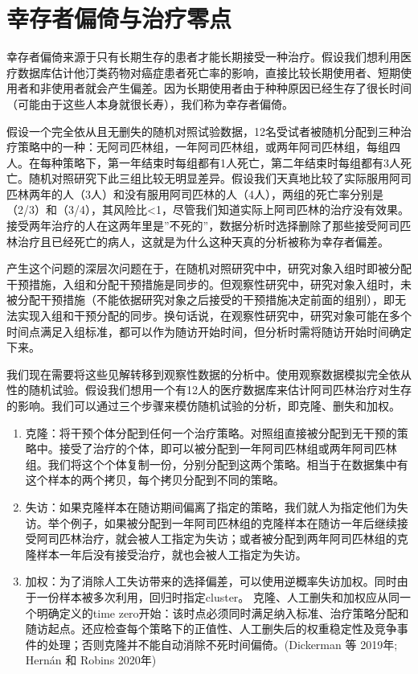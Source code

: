 \documentclass[
  chinese-hans,
  letterpaper,
  DIV=11,
  numbers=noendperiod]{scrreprt}
\begin{document}
\section{幸存者偏倚与治疗零点}\label{ux5e78ux5b58ux8005ux504fux501aux4e0eux6cbbux7597ux96f6ux70b9}

幸存者偏倚来源于只有长期生存的患者才能长期接受一种治疗。假设我们想利用医疗数据库估计他汀类药物对癌症患者死亡率的影响，直接比较长期使用者、短期使用者和非使用者就会产生偏差。因为长期使用者由于种种原因已经生存了很长时间（可能由于这些人本身就很长寿），我们称为幸存者偏倚。

假设一个完全依从且无删失的随机对照试验数据，12名受试者被随机分配到三种治疗策略中的一种：无阿司匹林组，一年阿司匹林组，或两年阿司匹林组，每组四人。在每种策略下，第一年结束时每组都有1人死亡，第二年结束时每组都有3人死亡。随机对照研究下此三组比较无明显差异。假设我们天真地比较了实际服用阿司匹林两年的人（3人）和没有服用阿司匹林的人（4人），两组的死亡率分别是（2/3）和（3/4），其风险比\textless1，尽管我们知道实际上阿司匹林的治疗没有效果。接受两年治疗的人在这两年里是''不死的''，数据分析时选择删除了那些接受阿司匹林治疗且已经死亡的病人，这就是为什么这种天真的分析被称为幸存者偏差。

产生这个问题的深层次问题在于，在随机对照研究中中，研究对象入组时即被分配干预措施，入组和分配干预措施是同步的。但观察性研究中，研究对象入组时，未被分配干预措施（不能依据研究对象之后接受的干预措施决定前面的组别），即无法实现入组和干预分配的同步。换句话说，在观察性研究中，研究对象可能在多个时间点满足入组标准，都可以作为随访开始时间，但分析时需将随访开始时间确定下来。

我们现在需要将这些见解转移到观察性数据的分析中。使用观察数据模拟完全依从性的随机试验。假设我们想用一个有12人的医疗数据库来估计阿司匹林治疗对生存的影响。我们可以通过三个步骤来模仿随机试验的分析，即克隆、删失和加权。

\begin{enumerate}
\def\labelenumi{\arabic{enumi}.}
\item
  克隆：将干预个体分配到任何一个治疗策略。对照组直接被分配到无干预的策略中。接受了治疗的个体，即可以被分配到一年阿司匹林组或两年阿司匹林组。我们将这个个体复制一份，分别分配到这两个策略。相当于在数据集中有这个样本的两个拷贝，每个拷贝分配到不同的策略。
\item
  失访：如果克隆样本在随访期间偏离了指定的策略，我们就人为指定他们为失访。举个例子，如果被分配到一年阿司匹林组的克隆样本在随访一年后继续接受阿司匹林治疗，就会被人工指定为失访；或者被分配到两年阿司匹林组的克隆样本一年后没有接受治疗，就也会被人工指定为失访。
\item
  加权：为了消除人工失访带来的选择偏差，可以使用逆概率失访加权。同时由于一份样本被多次利用，回归时指定cluster。
  克隆、人工删失和加权应从同一个明确定义的time
  zero开始：该时点必须同时满足纳入标准、治疗策略分配和随访起点。还应检查每个策略下的正值性、人工删失后的权重稳定性及竞争事件的处理；否则克隆并不能自动消除不死时间偏倚。(Dickerman
  等 2019年; Hernán 和 Robins 2020年)
\end{enumerate}
\end{document}
